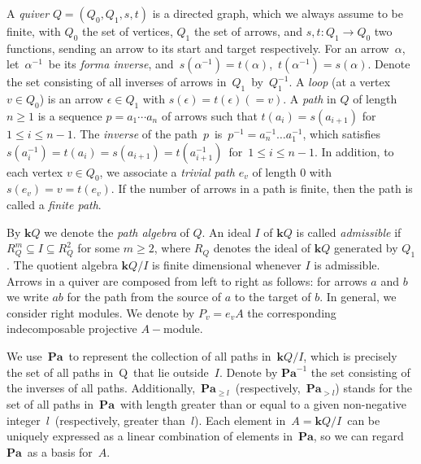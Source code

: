 \documentclass[11pt]{amsart}
\numberwithin{equation}{section}
\theoremstyle{definition}
\begin{document}
A \emph{quiver} \( Q = (Q_0, Q_1, s, t) \) is a directed graph, which we always assume to be finite, with \( Q_0 \) the set of vertices, \( Q_1 \) the set of arrows, and \( s, t: Q_1 \to Q_0 \) two functions, sending an arrow to its start and target respectively. For an arrow \(\alpha\), let \(\alpha^{-1}\) be its \emph{forma inverse}, and \(s(\alpha^{-1}) = t(\alpha)\), \(t(\alpha^{-1}) = s(\alpha)\). Denote the set consisting of all inverses of arrows in $Q_{1}$ by \(Q_{1}^{-1}\).
A \emph{loop} (at a vertex \( v \in Q_0 \)) is an arrow \( \epsilon \in Q_1 \) with \( s(\epsilon) = t(\epsilon) (= v) \). A \emph{path} in \( Q \) of length \( n \geq 1 \) is a sequence \(p = a_1 \cdots a_n \) of arrows such that \( t(a_i) = s(a_{i+1}) \) for \( 1 \leq i \leq n - 1 \). The \emph{inverse} of the path $p$ is \(p^{-1} = a_n^{-1} \dots a_1^{-1}\), which satisfies \(s(a_i^{-1}) = t(a_i) = s(a_{i + 1}) = t(a_{i + 1}^{-1})\) for \(1 \leq i \leq n - 1\). In addition, to each vertex \( v \in Q_0 \), we associate a \emph{trivial path} \( e_v \) of length \( 0 \) with \( s(e_v) = v = t(e_v) \). If the number of arrows in a path is finite, then the path is called a \emph{finite path}.


By \( \mathbf{k}Q \) we denote the \emph{path algebra} of \( Q \). An ideal \( I \) of \( \mathbf{k}Q \) is called \emph{admissible} if \( R_Q^m \subseteq I \subseteq R_Q^2 \) for some \( m \geq 2 \), where \( R_Q \) denotes the ideal of \( \mathbf{k}Q \) generated by \( Q_1 \). The quotient algebra \( \mathbf{k}Q / I \) is finite dimensional whenever \( I \) is admissible. Arrows in a quiver are composed from left to right as follows: for arrows $a$ and $b$ we write $ab$ for the path from the source of $a$ to the target of $b$. In general, we consider right modules. We denote  by $P_{v} = e_{v}A$ the corresponding indecomposable projective $A-$module.

We use \(\mathbf{Pa}\) to represent the collection of all paths in \(\mathbf{k}Q/I\), which is precisely the set of all paths in Q that lie outside $I$. Denote by \(\mathbf{Pa}^{-1}\)  the set consisting of the inverses of all paths. Additionally, \(\mathbf{Pa}_{\geq l}\) (respectively, \(\mathbf{Pa}_{> l}\)) stands for the set of all paths in \(\mathbf{Pa}\) with length greater than or equal to a given non-negative integer $l$ (respectively, greater than $l$). 
Each element in \(A = \mathbf{k}Q/I\) can be uniquely expressed as a linear combination of elements in \(\mathbf{Pa}\), so we can regard \(\mathbf{Pa}\) as a basis for $A$.
\end{document}
